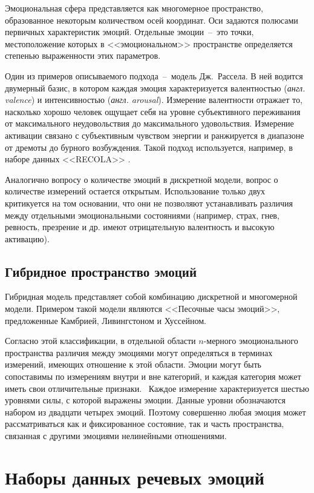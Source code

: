 Эмоциональная сфера представляется как многомерное пространство, образованное некоторым
количеством осей координат. Оси задаются полюсами первичных характеристик эмоций. Отдельные эмоции~--~это точки, местоположение которых в <<эмоциональном>> пространстве определяется степенью выраженности этих параметров.

Один из примеров описываемого подхода~--~модель Дж.~Рассела. В ней водится двумерный базис, в котором каждая эмоция характеризуется валентностью (\textit{англ. valence}) и интенсивностью (\textit{англ. arousal}). Измерение валентности отражает то,
насколько хорошо человек ощущает себя на уровне субъективного переживания от максимального неудовольствия до максимального удовольствия. Измерение активации связано с
субъективным чувством энергии и ранжируется в диапазоне от дремоты до бурного возбуждения. Такой подход используется, например, в наборе данных <<RECOLA>> \cite{RECOLA}.

Аналогично вопросу о количестве эмоций в дискретной модели, вопрос о количестве измерений остается открытым. Использование только двух критикуется на том основании, что они не позволяют устанавливать различия между отдельными эмоциональными состояниями (например, страх, гнев, ревность, презрение и др. имеют отрицательную валентность и высокую активацию).

\subsection{Гибридное пространство эмоций}
Гибридная модель представляет собой комбинацию дискретной и многомерной модели. Примером такой модели являются <<Песочные часы эмоций>>, предложенные Камбрией, Ливингстоном и Хуссейном.~\cite{hourglass} 

Согласно этой классификации, в отдельной области $n$-мерного эмоционального пространства различия между эмоциями могут определяться в терминах измерений, имеющих отношение к этой области. Эмоции могут быть сопоставимы по измерениям внутри и вне категорий, и каждая категория может иметь свои отличительные признаки.~\cite{Russell2003} Каждое измерение характеризуется шестью уровнями силы, с которой выражены эмоции. Данные уровни обозначаются набором из двадцати четырех эмоций. Поэтому совершенно любая эмоция может рассматриваться как и фиксированное состояние, так и часть пространства, связанная с другими эмоциями нелинейными отношениями. 

\section{Наборы данных речевых эмоций}
